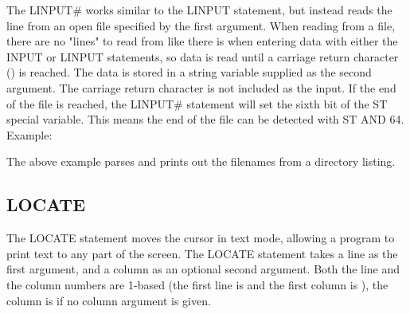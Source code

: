 The {\ttfamily LINPUT\#} works similar to the {\ttfamily LINPUT} statement, but
instead reads the line from an open file specified by the first argument.  When
reading from a file, there are no "lines" to read from like there is when
entering data with either the {\ttfamily INPUT} or {\ttfamily LINPUT}
statements, so data is read until a carriage return character ({})
is reached.  The data is stored in a string variable supplied as the second
argument.  The carriage return character is not included as the input.  If the
end of the file is reached, the {\ttfamily LINPUT\#} statement will set the
sixth bit of the {\ttfamily ST} special variable.  This means the end of the
file can be detected with {\ttfamily ST AND 64}.\\

Example:\\


The above example parses and prints out the filenames from a directory
listing.\\

\subsection{LOCATE}

The {\ttfamily LOCATE} statement moves the cursor in text mode, allowing a
program to print text to any part of the screen.  The {\ttfamily LOCATE}
statement takes a line as the first argument, and a column as an optional
second argument.  Both the line and the column numbers are 1-based (the first
line is {} and the first column is {}), the column is
{} if no column argument is given.\\

